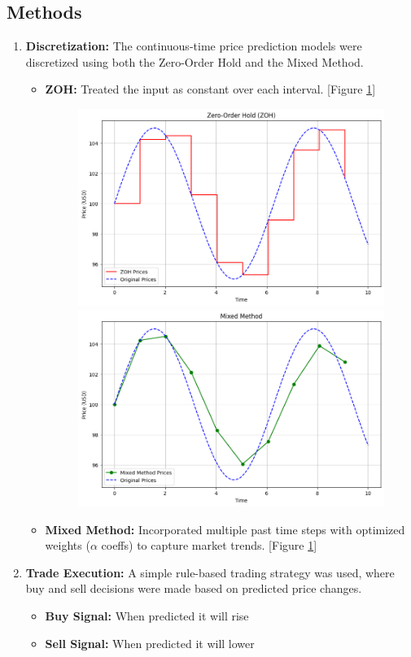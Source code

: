 \documentclass{article}
\begin{document}
\subsection{Methods}
\begin{enumerate}
    \item \textbf{Discretization:} The continuous-time price prediction models were discretized using both the Zero-Order Hold and the Mixed Method.
    \begin{itemize}
        \item \textbf{ZOH:} Treated the input as constant over each interval. [Figure \ref{fig:zohmm1}]
        \begin{figure}
            \centering
            \includegraphics[width=0.55\linewidth]{ZOH.png}
            \includegraphics[width=0.55\linewidth]{MM.png}
            \label{fig:zohmm1}
        \end{figure}
        \item \textbf{Mixed Method:} Incorporated multiple past time steps with optimized weights ($\alpha$ coeffs) to capture market trends. [Figure \ref{fig:zohmm1}]
    \end{itemize}
    \item \textbf{Trade Execution:} A simple rule-based trading strategy was used, where buy and sell decisions were made based on predicted price changes.
    \begin{itemize}
        \item \textbf{Buy Signal:} When predicted it will rise
        \item \textbf{Sell Signal:} When predicted it will lower
    \end{itemize}
\end{enumerate}
\end{document}

